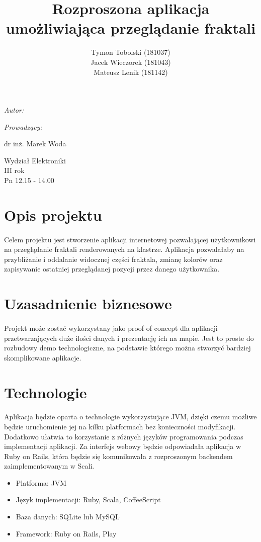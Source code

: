 \documentclass[wide,a4paper,titlepage,12pt]{article}
\title{Rozproszona aplikacja umożliwiająca przeglądanie fraktali}
\author{Tymon Tobolski {\small(181037)}\\ Jacek Wieczorek {\small(181043)} \\
Mateusz Lenik {\small(181142)}}
\makeatletter
\renewcommand{\maketitle}{
  \begin{titlepage}
    \begin{center}
      \vspace*{3cm}
      \LARGE \@title \par
      \vspace{2cm}
      \textit{\small Autor:}\par
      \normalsize \@author\par \normalsize
      \vspace{3cm}
      \textit{\small Prowadzący:}\par
      dr inż. Marek Woda \par
      \vspace{2cm}
      Wydział Elektroniki\\ III rok\\ Pn 12.15 - 14.00\par

    \end{center}
  \end{titlepage}
}
\makeatother
\begin{document}
\maketitle
\tableofcontents
\newpage

\section{Opis projektu}
\paragraph{}
Celem projektu jest stworzenie aplikacji internetowej pozwalającej użytkownikowi
na przeglądanie fraktali renderowanych na klastrze. Aplikacja
pozwalałaby na przybliżanie i oddalanie widocznej części fraktala, zmianę
kolorów oraz zapisywanie ostatniej przeglądanej pozycji przez danego
użytkownika.

\section{Uzasadnienie biznesowe}
\paragraph{}
Projekt może zostać wykorzystany jako proof of concept dla aplikacji
przetwarzających duże ilości danych i prezentację ich na mapie.
Jest to proste do rozbudowy demo technologiczne, na podstawie którego można
stworzyć bardziej skomplikowane aplikacje.

\section{Technologie}
\paragraph{}
Aplikacja będzie oparta o technologie wykorzystujące JVM, dzięki czemu możliwe
będzie uruchomienie jej na kilku platformach bez konieczności modyfikacji.
Dodatkowo ułatwia to korzystanie z różnych języków programowania podczas
implementacji aplikacji. Za interfejs webowy będzie odpowiadała aplikacja w Ruby
on Rails, która będzie się komunikowała z rozproszonym backendem
zaimplementowanym w Scali.

\begin{itemize}
  \item Platforma: JVM
  \item Język implementacji: Ruby, Scala, CoffeeScript
  \item Baza danych: SQLite lub MySQL
  \item Framework: Ruby on Rails, Play
\end{itemize}
\end{document}
